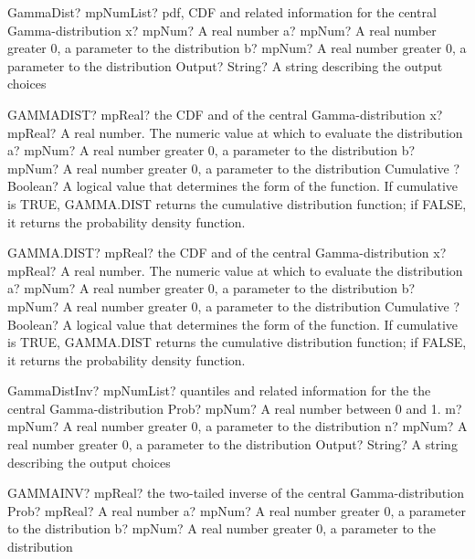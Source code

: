 \documentclass[12pt,a4paper,openany]{book}
\begin{document}
\begin{mpFunctionsExtract}
\mpFunctionFourNotImplemented
{GammaDist? mpNumList? pdf, CDF and related information for the central Gamma-distribution}
{x? mpNum? A real number}
{a? mpNum? A real number greater 0, a parameter to the distribution}
{b? mpNum? A real number greater 0, a parameter to the distribution}
{Output? String? A string describing the output choices}
\end{mpFunctionsExtract}

\begin{mpFunctionsExtract}
\mpWorksheetFunctionFourNotImplemented
{GAMMADIST? mpReal? the CDF and of the central Gamma-distribution}
{x? mpReal? A real number. The numeric value at which to evaluate the distribution}
{a? mpNum? A real number greater 0, a parameter to the distribution}
{b? mpNum? A real number greater 0, a parameter to the distribution}
{Cumulative ? Boolean? A logical value that determines the form of the function. If cumulative is TRUE, GAMMA.DIST returns the cumulative distribution function; if FALSE, it returns the probability density function.}
\end{mpFunctionsExtract}

\begin{mpFunctionsExtract}
\mpWorksheetFunctionFourNotImplemented
{GAMMA.DIST? mpReal? the CDF and of the central Gamma-distribution}
{x? mpReal? A real number. The numeric value at which to evaluate the distribution}
{a? mpNum? A real number greater 0, a parameter to the distribution}
{b? mpNum? A real number greater 0, a parameter to the distribution}
{Cumulative ? Boolean? A logical value that determines the form of the function. If cumulative is TRUE, GAMMA.DIST returns the cumulative distribution function; if FALSE, it returns the probability density function.}
\end{mpFunctionsExtract}

\begin{mpFunctionsExtract}
\mpFunctionThreeNotImplemented
{GammaDistInv? mpNumList? quantiles and related information for the the central Gamma-distribution}
{Prob? mpNum? A real number between 0 and 1.}
{m? mpNum? A real number greater 0, a parameter to the distribution}
{n? mpNum? A real number greater 0, a parameter to the distribution}
{Output? String? A string describing the output choices}
\end{mpFunctionsExtract}

\begin{mpFunctionsExtract}
\mpWorksheetFunctionThreeNotImplemented
{GAMMAINV? mpReal? the two-tailed inverse of the central Gamma-distribution}
{Prob? mpReal? A real number}
{a? mpNum? A real number greater 0, a parameter to the distribution}
{b? mpNum? A real number greater 0, a parameter to the distribution}
\end{mpFunctionsExtract}
\end{document}
